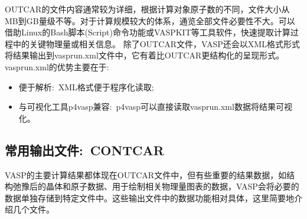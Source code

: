 %
%
%
\textrm{OUTCAR}的文件内容通常较为详细，根据计算对象原子数的不同，文件大小从\textrm{MB}到\textrm{GB}量级不等。对于计算规模较大的体系，通览全部文件必要性不大。可以借助\textrm{Linux}的\textrm{Bash}脚本(\textrm{Script})命令功能或\textrm{VASPKIT}等工具软件，快速提取计算过程中的关键物理量或相关信息。
%
%
除了\textrm{OUTCAR}文件，\textrm{VASP}还会以\textrm{XML}格式形式将结果输出到\textrm{vasprun.xml}文件中，它有着比\textrm{OUTCAR}更结构化的呈现形式。\textrm{vasprun.xml}的优势主要在于:
\begin{itemize}
	\item 便于解析:~\textrm{XML}格式便于程序化读取;
	\item 与可视化工具\textrm{p4vasp}兼容:~\textrm{p4vasp}可以直接读取\textrm{vasprun.xml}数据将结果可视化。
\end{itemize}


\subsection{常用输出文件:~\rm{CONTCAR}}\label{subsect:CONTCAR}
\textrm{VASP}的主要计算结果都体现在\textrm{OUTCAR}文件中，但有些重要的结果数据，如结构弛豫后的晶体和原子数据、用于绘制相关物理量图表的数据，\textrm{VASP}会将必要的数据单独存储到特定文件中。这些输出文件中的数据功能相对具体，这里简要地介绍几个文件。
%
%

